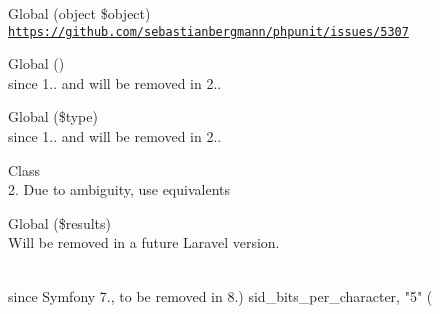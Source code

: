 \begin{DoxyRefList}
\item[Global \doxylink{class_p_h_p_unit_1_1_framework_1_1_mock_object_1_1_mock_builder_afdd68f7bc55fe2d23e049930cc74ff22}{Mock\+Builder\+::set\+Proxy\+Target} (object \$object)]\hfill \\
\label{deprecated__deprecated000310}%
%
\href{https://github.com/sebastianbergmann/phpunit/issues/5307}{\texttt{https\+://github.\+com/sebastianbergmann/phpunit/issues/5307}} 
\item[Global \doxylink{class_mockery_a73de77599d773c5e022329e54a2ec132}{Mockery\+::built\+In\+Types} ()]\hfill \\
\label{deprecated__deprecated000163}%
%
since 1.. and will be removed in 2..  
\item[Global \doxylink{class_mockery_aafecee60771477eee5824d82a403da97}{Mockery\+::is\+Built\+In\+Type} (\$type)]\hfill \\
\label{deprecated__deprecated000164}%
%
since 1.. and will be removed in 2..  
\item[Class \doxylink{class_mockery_1_1_matcher_1_1_must_be}{Must\+Be} ]\hfill \\
\label{deprecated__deprecated000171}%
%
2. Due to ambiguity, use  equivalents  
\item[Global \doxylink{class_illuminate_1_1_database_1_1_query_1_1_processors_1_1_my_sql_processor_ac77d2c2c3990c647ef0056ff6a0d7886}{My\+Sql\+Processor\+::process\+Column\+Listing} (\$results)]\hfill \\
\label{deprecated__deprecated000111}%
%
Will be removed in a future Laravel version. 
\item[Global \doxylink{class_symfony_1_1_component_1_1_http_foundation_1_1_session_1_1_storage_1_1_native_session_storage_af4143599b4a27e918a8d9730d47085f0}{Native\+Session\+Storage\+::\+\_\+\+\_\+construct} (array \$options=\mbox{[}\mbox{]}, Abstract\+Proxy\texorpdfstring{$\vert$}{|}\textbackslash{}Session\+Handler\+Interface\texorpdfstring{$\vert$}{|}null \$handler=null, ?\doxylink{class_symfony_1_1_component_1_1_http_foundation_1_1_session_1_1_storage_1_1_metadata_bag}{Metadata\+Bag} \$meta\+Bag=null)]\hfill \\
\label{deprecated__deprecated000431}%
%
since Symfony 7., to be removed in 8.) sid\+\_\+bits\+\_\+per\+\_\+character, "{}5"{} ( 




\end{DoxyRefList}
